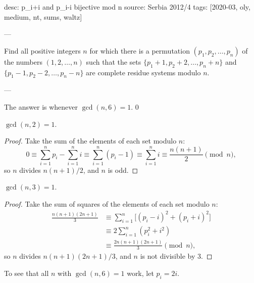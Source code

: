desc: p_i+i and p_i-i bijective mod n
source: Serbia 2012/4
tags: [2020-03, oly, medium, nt, sums, waltz]

---

Find all positive integers $n$ for which there is a permutation $(p_1,p_2,\ldots,p_n)$ of the numbers $(1,2,\ldots,n)$ such that the sets $\{p_1+1,p_2+2,\ldots,p_n+n\}$ and $\{p_1-1,p_2-2,\ldots,p_n-n\}$ are complete residue systems modulo $n$.

---

The answer is whenever $\gcd(n,6)=1$. 
\setcounter{claim}0
\begin{claim}
    $\gcd(n,2)=1$.
\end{claim}
\begin{proof}
    Take the sum of the elements of each set modulo $n$: \[0\equiv\sum_{i=1}^np_i-\sum_{i=1}^ni\equiv\sum_{i=1}^n(p_i-1)\equiv\sum_{i=1}^ni\equiv\frac{n(n+1)}2\pmod n,\]
    so $n$ divides $n(n+1)/2$, and $n$ is odd.
\end{proof}
\begin{claim}
    $\gcd(n,3)=1$.
\end{claim}
\begin{proof}
    Take the sum of squares of the elements of each set modulo $n$:
    \begin{align*}
        \frac{n(n+1)(2n+1)}3&\equiv\sum_{i=1}^n\Big[(p_i-i)^2+(p_i+i)^2\Big]\\
        &\equiv2\sum_{i=1}^n\left(p_i^2+i^2\right)\\
        &\equiv\frac{2n(n+1)(2n+1)}3\pmod n,
    \end{align*}
    so $n$ divides $n(n+1)(2n+1)/3$, and $n$ is not divisible by $3$.
\end{proof}

To see that all $n$ with $\gcd(n,6)=1$ work, let $p_i=2i$.
